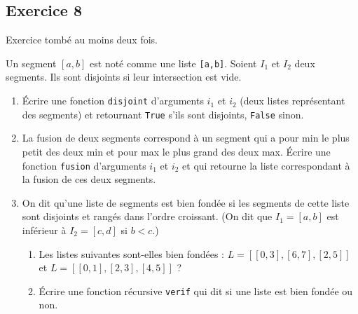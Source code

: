 \documentclass[10pt,fleqn]{article} %
\begin{document}
\begin{multicols}{2}
\subsection*{Exercice 8}
\begin{rem}
Exercice tombé au moins deux fois.
\end{rem}

Un segment $[a,b]$ est noté comme une liste \texttt{[a,b]}. Soient $I_1$ et $I_2$ deux segments. Ils sont disjoints si leur intersection est vide. 

\begin{enumerate}
\item Écrire une fonction \texttt{disjoint} d'arguments $i_1$ et $i_2$ (deux listes représentant des segments) et retournant \texttt{True} s'ils sont disjoints, \texttt{False} sinon. 
\item La fusion de deux segments correspond à un segment qui a pour min le plus petit des deux min et pour max le plus grand des deux max. Écrire une fonction \texttt{fusion} d'arguments $i_1$ et $i_2$ et qui retourne la liste correspondant à la fusion de ces deux segments. 
\item On dit qu'une liste de segments est bien fondée si les segments de cette liste sont disjoints et rangés dans l'ordre croissant. (On dit que $I_1=[a,b]$ est inférieur à $I_2=[c,d]$ si $b<c$.)
\begin{enumerate}
\item Les listes suivantes sont-elles bien fondées : $L=[[0,3],[6,7],[2,5]]$ et $L=[[0,1],[2,3],[4,5]]$ ?
\item Écrire une fonction récursive \texttt{verif} qui dit si une liste est bien fondée ou non.
\end{enumerate}
\end{enumerate}




\end{multicols}
\end{document}
